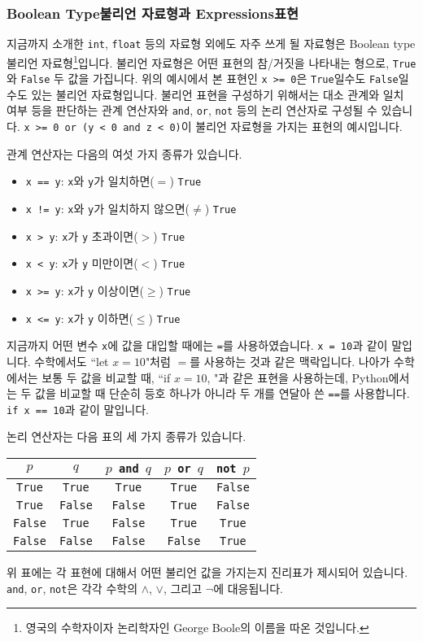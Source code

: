 \documentclass[../main.tex]{subfiles}
\begin{document}
\subsubsection{Boolean Type불리언 자료형과 Expressions표현}
지금까지 소개한 \texttt{int}, \texttt{float} 등의 자료형 외에도 자주 쓰게 될 자료형은 Boolean type불리언 자료형\footnote{영국의 수학자이자 논리학자인 George Boole의 이름을 따온 것입니다.}입니다.
불리언 자료형은 어떤 표현의 참/거짓을 나타내는 형으로, \texttt{True}와 \texttt{False} 두 값을 가집니다.
위의 예시에서 본 표현인 \texttt{x >= 0}은 \texttt{True}일수도 \texttt{False}일수도 있는 불리언 자료형입니다.
불리언 표현을 구성하기 위해서는 대소 관계와 일치 여부 등을 판단하는 관계 연산자와 \texttt{and}, \texttt{or}, \texttt{not} 등의 논리 연산자로 구성될 수 있습니다.
\texttt{x >= 0 or (y < 0 and z < 0)}이 불리언 자료형을 가지는 표현의 예시입니다.

관계 연산자는 다음의 여섯 가지 종류가 있습니다.
\begin{itemize}
	\item \texttt{x == y}: \texttt{x}와 \texttt{y}가 일치하면($=$) \texttt{True}
	\item \texttt{x != y}: \texttt{x}와 \texttt{y}가 일치하지 않으면($\neq$) \texttt{True}
	\item \texttt{x > y}: \texttt{x}가 \texttt{y} 초과이면($>$) \texttt{True}
	\item \texttt{x < y}: \texttt{x}가 \texttt{y} 미만이면($<$) \texttt{True}
	\item \texttt{x >= y}: \texttt{x}가 \texttt{y} 이상이면($\geq$) \texttt{True}
	\item \texttt{x <= y}: \texttt{x}가 \texttt{y} 이하면($\leq$) \texttt{True}
\end{itemize}
지금까지 어떤 변수 \texttt{x}에 값을 대입할 때에는 \texttt{=}를 사용하였습니다.
\texttt{x = 10}과 같이 말입니다.
수학에서도 ``let $x= 10$"처럼 $=$를 사용하는 것과 같은 맥락입니다.
나아가 수학에서는 보통 두 값을 비교할 때, ``if $x = 10$, "과 같은 표현을 사용하는데, Python에서는 두 값을 비교할 때 단순히 등호 하나가 아니라 두 개를 연달아 쓴 \texttt{==}를 사용합니다.
\texttt{if x == 10}과 같이 말입니다.

논리 연산자는 다음 표의 세 가지 종류가 있습니다.
\begin{table}[H]
    \centering
    \begin{tabular}{c|c|c|c|c}
        $p$ & $q$ & \texttt{$p$ and $q$} & \texttt{$p$ or $q$} & \texttt{not $p$}\\ \hline
        \texttt{True} & \texttt{True} & \texttt{True} & \texttt{True} & \texttt{False}          \\
        \texttt{True} & \texttt{False} & \texttt{False} & \texttt{True} & \texttt{False}          \\
        \texttt{False} & \texttt{True} & \texttt{False} & \texttt{True} & \texttt{True}          \\
        \texttt{False} & \texttt{False} & \texttt{False} & \texttt{False} & \texttt{True}
    \end{tabular}
\end{table}
위 표에는 각 표현에 대해서 어떤 불리언 값을 가지는지 진리표가 제시되어 있습니다.
\texttt{and}, \texttt{or}, \texttt{not}은 각각 수학의 $\wedge$, $\vee$, 그리고 $\neg$에 대응됩니다.
\end{document}
